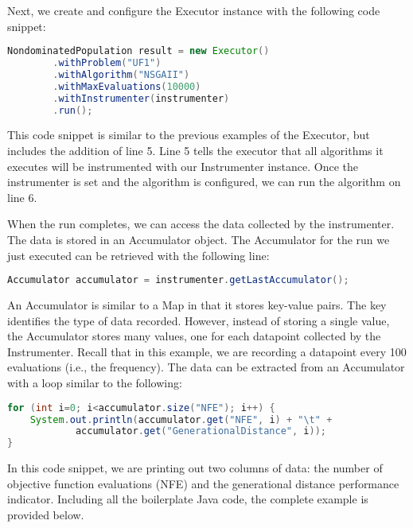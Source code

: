 Next, we create and configure the Executor instance with the following code snippet:

\begin{lstlisting}[language=Java]
NondominatedPopulation result = new Executor()
		.withProblem("UF1")
		.withAlgorithm("NSGAII")
		.withMaxEvaluations(10000)
		.withInstrumenter(instrumenter)
		.run();
\end{lstlisting}

This code snippet is similar to the previous examples of the Executor, but includes the addition of line 5.  Line 5 tells the executor that all algorithms it executes will be instrumented with our Instrumenter instance.  Once the instrumenter is set and the algorithm is configured, we can run the algorithm on line 6.

When the run completes, we can access the data collected by the instrumenter.  The data is stored in an Accumulator object.  The Accumulator for the run we just executed can be retrieved with the following line:

\begin{lstlisting}[language=Java]
Accumulator accumulator = instrumenter.getLastAccumulator();
\end{lstlisting}

An Accumulator is similar to a Map in that it stores key-value pairs.  The key identifies the type of data recorded.  However, instead of storing a single value, the Accumulator stores many values, one for each datapoint collected by the Instrumenter.  Recall that in this example, we are recording a datapoint every 100 evaluations (i.e., the frequency).  The data can be extracted from an Accumulator with a loop similar to the following:

\begin{lstlisting}[language=Java]
for (int i=0; i<accumulator.size("NFE"); i++) {
	System.out.println(accumulator.get("NFE", i) + "\t" +  
			accumulator.get("GenerationalDistance", i));
}
\end{lstlisting}

In this code snippet, we are printing out two columns of data: the number of objective function evaluations (NFE) and the generational distance performance indicator.  Including all the boilerplate Java code, the complete example is provided below.

